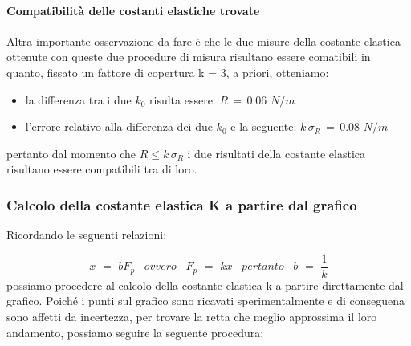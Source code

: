 \paragraph{Compatibilità delle costanti elastiche trovate\\}
Altra importante osservazione da fare è che le due misure della costante elastica ottenute con queste due procedure di misura risultano essere comatibili in quanto, fissato un fattore di copertura k = 3, a priori, otteniamo:
\begin{itemize}
	\item{la differenza tra i due $k_0$ risulta essere: $R \,=\, 0.06 \,\, N/m$}
	\item{l'errore relativo alla differenza dei due $k_0$ e la seguente: $k \, \sigma_R \,=\, 0.08 \,\, N/m$}
\end{itemize}
pertanto dal momento che $ R \leq k \, \sigma_R$ i due risultati della costante elastica risultano essere compatibili tra di loro.

\subsubsection{Calcolo della costante elastica K a partire dal grafico}
Ricordando le seguenti relazioni:

\begin{equation}
	x \,\,=\,\, bF_p \,\,\,\,\,ovvero\,\,\,\,\, F_p \,\,=\,\, kx \,\,\,\,\,pertanto\,\,\,\,\, b \,\,=\,\, \frac{1}{k}
\end{equation}
%
possiamo procedere al calcolo della costante elastica k a partire direttamente dal grafico. Poiché i punti sul grafico sono ricavati sperimentalmente e di conseguena sono affetti da incertezza, per trovare la retta che meglio approssima il loro andamento, possiamo seguire la seguente procedura:

